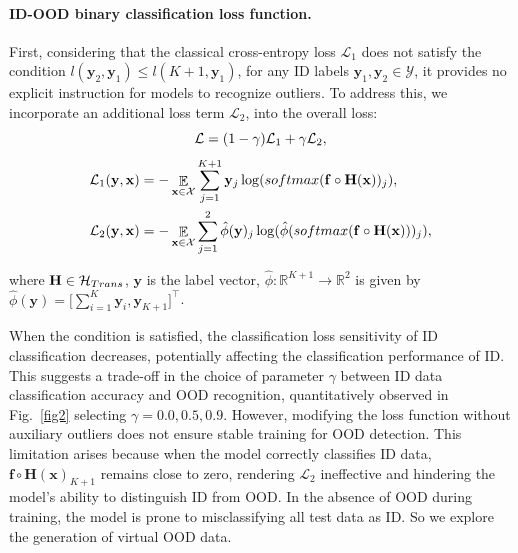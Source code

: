 \documentclass{article}
\theoremstyle{plain}
\theoremstyle{definition}
\theoremstyle{remark}
\begin{document}
\paragraph{ID-OOD binary classification loss function.}
First, considering that the classical cross-entropy loss $\mathcal{L}_1$ does not satisfy the condition $l(\mathbf{y}_2, \mathbf{y}_1) \leq l(K + 1, \mathbf{y}_1)$, for any ID labels $\mathbf{y}_1, \mathbf{y}_2 \in \mathcal{Y}$, it provides no explicit instruction for models to recognize outliers. To address this, we incorporate an additional loss term
$\mathcal{L}_2$, into the overall loss:
\begin{equation}
\small
\mathcal{L} = (1-\gamma) \mathcal{L}_1 + \gamma \mathcal{L}_2,
    \label{eq: 15}
\end{equation}
\begin{equation}
\small
\begin{aligned}
    \mathcal{L}_1(\mathbf{y}, \mathbf{x}) &= -\mathop{\mathbb{E}}\limits_{\mathbf{x}\in \mathcal{X}} \sum_{j=1}^{K+1} \mathbf{y}_j \log({\rm softmax}(\mathbf{f}\circ\mathbf{H}(\mathbf{x}))_{j}),\\
    \mathcal{L}_2(\mathbf{y}, \mathbf{x}) &= 
    -\mathop{\mathbb{E}}\limits_{\mathbf{x}\in \mathcal{X}} \sum_{j=1}^{2}\hat{\phi}(\mathbf{y} )_j\log(\hat{\phi}({\rm softmax}(\mathbf{f}\circ\mathbf{H}(\mathbf{x})))_{j}),
\end{aligned}
    \label{eq: 15-2}
\end{equation}

where $\mathbf{H} \in \mathcal{H}_{\rm Trans}$, $\mathbf{y}$ is the label vector, $\hat{\phi}:\mathbb{R}^{K+1}\xrightarrow{}\mathbb{R}^{2}$ is given by
    $\hat{\phi}(\mathbf{y}) = 
        \bigl[\sum_{i=1}^{K}\mathbf{y}_i, 
        \mathbf{y}_{K+1}\bigr]^{\top}$.

When the condition is satisfied, the classification loss sensitivity of ID classification decreases, potentially affecting the classification performance of ID. This suggests a trade-off in the choice of parameter $\gamma$ between ID data classification accuracy and OOD recognition, quantitatively observed in Fig.~\ref{fig2} selecting $\gamma=0.0,0.5,0.9$. However, modifying the loss function without auxiliary outliers does not ensure stable training for OOD detection. This limitation arises because when the model correctly classifies ID data, $\mathbf{f}\circ\mathbf{H}(\mathbf{x})_{K+1}$ remains close to zero, rendering $\mathcal{L}_2$ ineffective and hindering the model's ability to distinguish ID from OOD. In the absence of OOD during training, the model is prone to misclassifying all test data as ID. So we explore the generation of virtual OOD data.
\end{document}
